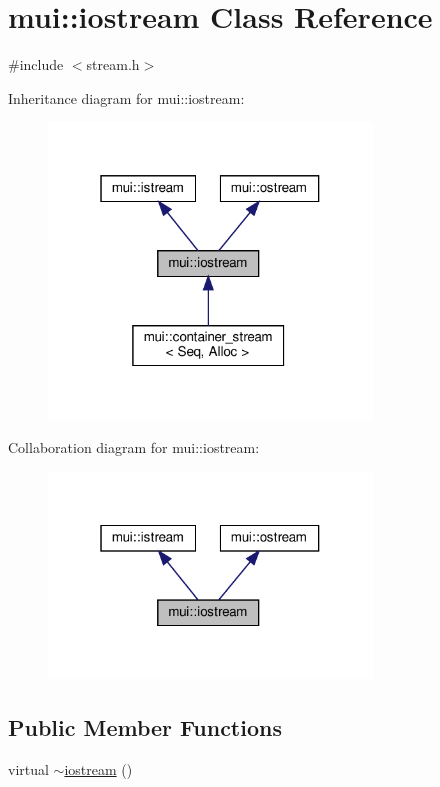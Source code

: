 \hypertarget{classmui_1_1iostream}{}\section{mui\+:\+:iostream Class Reference}
\label{classmui_1_1iostream}


{\ttfamily \#include $<$stream.\+h$>$}



Inheritance diagram for mui\+:\+:iostream\+:
\nopagebreak
\begin{figure}[H]
\begin{center}
\leavevmode
\includegraphics[width=244pt]{classmui_1_1iostream__inherit__graph}
\end{center}
\end{figure}


Collaboration diagram for mui\+:\+:iostream\+:
\nopagebreak
\begin{figure}[H]
\begin{center}
\leavevmode
\includegraphics[width=244pt]{classmui_1_1iostream__coll__graph}
\end{center}
\end{figure}
\subsection*{Public Member Functions}
\begin{DoxyCompactItemize}
\item 
virtual \hyperlink{classmui_1_1iostream_af412ceca6334a3ad45c0ca6799ecae10}{$\sim$iostream} ()
\end{DoxyCompactItemize}


